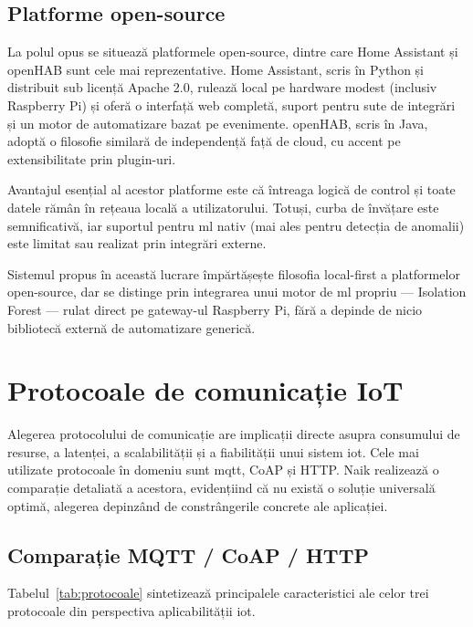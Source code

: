 \subsection{Platforme open-source}

La polul opus se situează platformele open-source, dintre care Home Assistant și openHAB
sunt cele mai reprezentative. Home Assistant, scris în Python și distribuit sub licență
Apache 2.0, rulează local pe hardware modest (inclusiv Raspberry Pi) și oferă o interfață
web completă, suport pentru sute de integrări și un motor de automatizare bazat pe
evenimente. openHAB, scris în Java, adoptă o filosofie similară de independență față de
cloud, cu accent pe extensibilitate prin plugin-uri.

Avantajul esențial al acestor platforme este că întreaga logică de control și toate datele
rămân în rețeaua locală a utilizatorului. Totuși, curba de învățare este semnificativă,
iar suportul pentru \gls{ml} nativ (mai ales pentru detecția de anomalii) este limitat sau
realizat prin integrări externe.

Sistemul propus în această lucrare împărtășește filosofia local-first a platformelor
open-source, dar se distinge prin integrarea unui motor de \gls{ml} propriu — Isolation
Forest — rulat direct pe gateway-ul Raspberry Pi, fără a depinde de nicio bibliotecă
externă de automatizare generică.

\section{Protocoale de comunicație IoT}
\label{sec:studii-protocoale}

Alegerea protocolului de comunicație are implicații directe asupra consumului de resurse,
a latenței, a scalabilității și a fiabilității unui sistem \gls{iot}. Cele mai utilizate
protocoale în domeniu sunt \gls{mqtt}, CoAP și HTTP. Naik \cite{naik2017mqttcomparison}
realizează o comparație detaliată a acestora, evidențiind că nu există o soluție universală
optimă, alegerea depinzând de constrângerile concrete ale aplicației.

\subsection{Comparație MQTT / CoAP / HTTP}

Tabelul~\ref{tab:protocoale} sintetizează principalele caracteristici ale celor trei
protocoale din perspectiva aplicabilității \gls{iot}.

